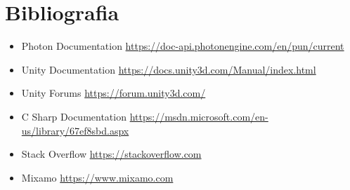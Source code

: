 \section{Bibliografia}

\begin{itemize}
\item Photon Documentation \url{https://doc-api.photonengine.com/en/pun/current}
\item Unity Documentation \url{https://docs.unity3d.com/Manual/index.html}
\item Unity Forums \url{https://forum.unity3d.com/}
\item C Sharp Documentation \url{https://msdn.microsoft.com/en-us/library/67ef8sbd.aspx}
\item Stack Overflow \url{https://stackoverflow.com}
\item Mixamo \url{https://www.mixamo.com}
\end{itemize}